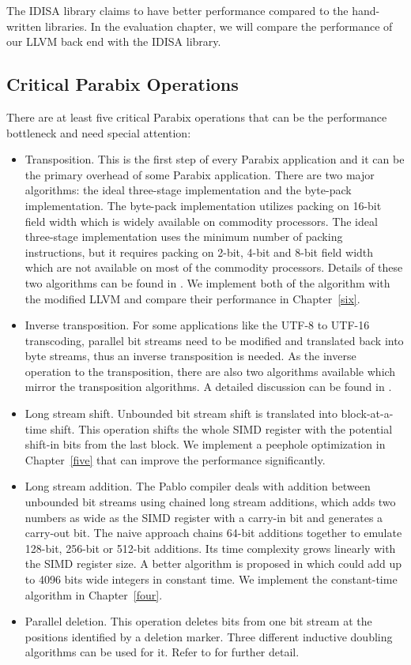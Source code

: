 The IDISA library claims to have better performance compared to the hand-written libraries. In the evaluation chapter, we will compare the performance of our LLVM back end with the IDISA library.

\subsection{Critical Parabix Operations}
There are at least five critical Parabix operations that can be the performance bottleneck and need special attention:
\begin{itemize}
    \item Transposition. This is the first step of every Parabix application and it can be the primary overhead of some Parabix application. There are two major algorithms: the ideal three-stage implementation and the byte-pack implementation. The byte-pack implementation utilizes packing on 16-bit field width which is widely available on commodity processors. The ideal three-stage implementation uses the minimum number of packing instructions, but it requires packing on 2-bit, 4-bit and 8-bit field width which are not available on most of the commodity processors. Details of these two algorithms can be found in \cite{inductive_doubling_principle}. We implement both of the algorithm with the modified LLVM and compare their performance in Chapter~\ref{six}.

    \item Inverse transposition. For some applications like the UTF-8 to UTF-16 transcoding, parallel bit streams need to be modified and translated back into byte streams, thus an inverse transposition is needed. As the inverse operation to the transposition, there are also two algorithms available which mirror the transposition algorithms. A detailed discussion can be found in \cite{rob_u8u16}.

    \item Long stream shift. Unbounded bit stream shift is translated into block-at-a-time shift. This operation shifts the whole SIMD register with the potential shift-in bits from the last block. We implement a peephole optimization in Chapter~\ref{five} that can improve the performance significantly.

    \item Long stream addition. The Pablo compiler deals with addition between unbounded bit streams using chained long stream additions, which adds two numbers as wide as the SIMD register with a carry-in bit and generates a carry-out bit. The naive approach chains 64-bit additions together to emulate 128-bit, 256-bit or 512-bit additions. Its time complexity grows linearly with the SIMD register size. A better algorithm is proposed in \cite{rob_regex} which could add up to 4096 bits wide integers in constant time. We implement the constant-time algorithm in Chapter~\ref{four}.

    \item Parallel deletion. This operation deletes bits from one bit stream at the positions identified by a deletion marker. Three different inductive doubling algorithms can be used for it. Refer to \cite{rob_u8u16} for further detail.
\end{itemize}


